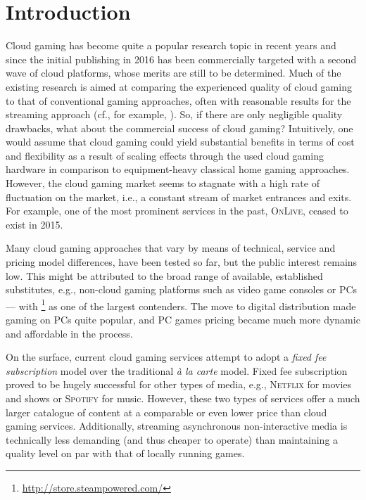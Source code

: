\section{Introduction}

Cloud gaming has become quite a popular research topic in recent years and since the initial publishing in 2016 has been commercially targeted with a second wave of cloud platforms, whose merits are still to be determined. Much of the existing research is aimed at comparing the experienced quality of cloud gaming to that of conventional gaming approaches, often with reasonable results for the streaming approach (cf., for example, \cite{5976180}). So, if there are only negligible quality drawbacks, what about the commercial success of cloud gaming? Intuitively, one would assume that cloud gaming could yield substantial benefits in terms of cost and flexibility as a result of scaling effects through the used cloud gaming hardware in comparison to equipment-heavy classical home gaming approaches. However, the cloud gaming market seems to stagnate with a high rate of fluctuation on the market, i.e., a constant stream of market entrances and exits. For example, one of the most prominent services in the past, \textsc{OnLive}, ceased to exist in 2015.

Many cloud gaming approaches that vary by means of technical, service and pricing model differences, have been tested so far, but the public interest remains low. This might be attributed to the broad range of available, established substitutes, e.g., non-cloud gaming platforms such as video game consoles or PCs --- with \steam\footnote{\url{http://store.steampowered.com/}} as one of the largest contenders. The move to digital distribution made gaming on PCs quite popular, and PC games pricing became much more dynamic and affordable in the process.

On the surface, current cloud gaming services attempt to adopt a \textit{fixed fee subscription} model over the traditional \textit{à la carte} model. Fixed fee subscription proved to be hugely successful for other types of media, e.g., \textsc{Netflix} for movies and shows or \textsc{Spotify} for music. However, these two types of services offer a much larger catalogue of content at a comparable or even lower price than cloud gaming services. Additionally, streaming asynchronous non-interactive media is technically less demanding (and thus cheaper to operate) than maintaining a quality level on par with that of locally running games.

